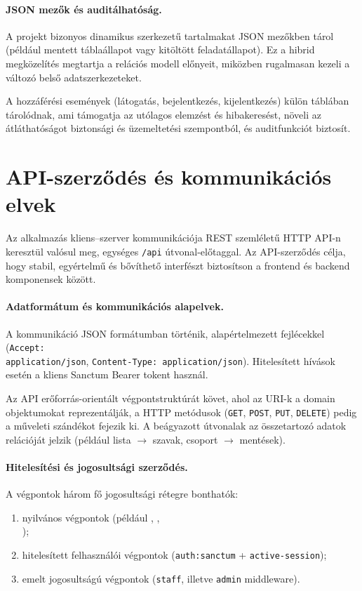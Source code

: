 \documentclass{thesis-ekf}
\begin{document}
\paragraph{JSON mezők és auditálhatóság.}
A projekt bizonyos dinamikus szerkezetű tartalmakat JSON mezőkben \cite{json-org} tárol (például mentett táblaállapot vagy kitöltött feladatállapot). Ez a hibrid megközelítés megtartja a relációs modell előnyeit, miközben rugalmasan kezeli a változó belső adatszerkezeteket.

A hozzáférési események (látogatás, bejelentkezés, kijelentkezés) külön táblában tárolódnak, ami támogatja az utólagos elemzést és hibakeresést, növeli az átláthatóságot biztonsági és üzemeltetési szempontból, és auditfunkciót biztosít.

\section{API-szerződés és kommunikációs elvek}
Az alkalmazás kliens--szerver kommunikációja REST szemléletű HTTP API-n keresztül valósul meg, egységes \texttt{/api} útvonal-előtaggal. Az API-szerződés célja, hogy stabil, egyértelmű és bővíthető interfészt biztosítson a frontend és backend komponensek között.

\paragraph{Adatformátum és kommunikációs alapelvek.}
A kommunikáció JSON formátumban történik, alapértelmezett fejlécekkel (\texttt{Accept:}\\ \texttt{application/json}, \texttt{Content-Type: application/json}). Hitelesített hívások esetén a kliens Sanctum Bearer tokent használ.

Az API erőforrás-orientált végpontstruktúrát követ, ahol az URI-k a domain objektumokat reprezentálják, a HTTP metódusok (\texttt{GET}, \texttt{POST}, \texttt{PUT}, \texttt{DELETE}) pedig a műveleti szándékot fejezik ki. A beágyazott útvonalak az összetartozó adatok relációját jelzik (például lista $\rightarrow$ szavak, csoport $\rightarrow$ mentések).

\paragraph{Hitelesítési és jogosultsági szerződés.}
A végpontok három fő jogosultsági rétegre bonthatók:
\begin{enumerate}
  \item nyilvános végpontok (például , ,\\ );
  \item hitelesített felhasználói végpontok (\texttt{auth:sanctum} + \texttt{active-session});
  \item emelt jogosultságú végpontok (\texttt{staff}, illetve \texttt{admin} middleware).
\end{enumerate}
\end{document}
